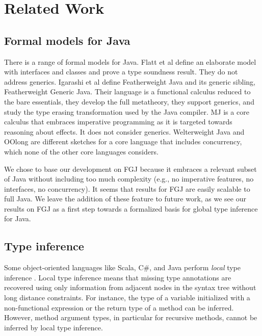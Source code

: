 \section{Related Work}
\label{sec:related-work}


\subsection{Formal models for Java}
\label{sec:formal-models-java}

There is a range of formal models for Java. Flatt et al
\cite{DBLP:conf/java/FlattKF99} define an elaborate model with
interfaces and classes and prove a type soundness result. They do not
address generics. Igarashi et al
\cite{DBLP:journals/toplas/IgarashiPW01} define Featherweight Java
and its generic sibling, Featherweight Generic Java. Their language is
a functional calculus reduced to the bare essentials, they develop the full metatheory, they
support generics, and study the type erasing transformation used by
the Java compiler. MJ \cite{UCAM-CL-TR-563} is a core calculus that
embraces imperative programming as it is targeted towards reasoning
about effects. It does not consider generics. Welterweight Java
\cite{DBLP:conf/tools/OstlundW10} and OOlong
\cite{DBLP:conf/sac/CastegrenW18} are different sketches for a core
language that includes concurrency, which none of the other core
languages considers. 

We chose to base our development on FGJ because it embraces a relevant
subset of Java without including too much complexity (e.g., no imperative
features, no interfaces, no concurrency). It seems that results for
FGJ are easily scalable to full Java. We leave the addition of these
feature to future work, as we see our results on FGJ as a first step
towards a formalized basis for global type inference for Java.

\subsection{Type inference}

Some object-oriented languages like Scala, C\#, and Java perform
\emph{local} type inference \cite{PT98,OZZ01}. Local type 
inference means that missing type annotations are recovered using only
information from adjacent nodes in the syntax tree without long distance
constraints. For instance, the type of a variable initialized with a
non-functional expression or the return type of a method can be
inferred. However, method argument types, in particular for recursive
methods, cannot be inferred by local type inference.

